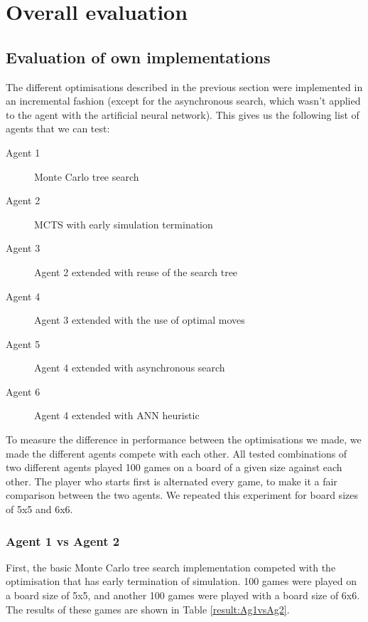 \section{Overall evaluation\label{s:evaluation}}

\subsection{Evaluation of own implementations\label{s:evaluationOwn}}
The different optimisations described in the previous section were implemented in an incremental fashion (except for the asynchronous search, which wasn't applied to the agent with the artificial neural network). This gives us the following list of agents that we can test:
\begin{description}
	\item[Agent 1] Monte Carlo tree search
	\item[Agent 2] MCTS with early simulation termination
	\item[Agent 3] Agent 2 extended with reuse of the search tree
	\item[Agent 4] Agent 3 extended with the use of optimal moves
	\item[Agent 5] Agent 4 extended with asynchronous search
	\item[Agent 6] Agent 4 extended with ANN heuristic
\end{description}

To measure the difference in performance between the optimisations we made, we made the different agents compete with each other. All tested combinations of two different agents played 100 games on a board of a given size against each other. The player who starts first is alternated every game, to make it a fair comparison between the two agents.
We repeated this experiment for board sizes of 5x5 and 6x6.

\subsubsection{Agent 1 vs Agent 2}
First, the basic Monte Carlo tree search implementation competed with the optimisation that has early termination of simulation. 100 games were played on a board size of 5x5, and another 100 games were played with a board size of 6x6. The results of these games are shown in Table \ref{result:Ag1vsAg2}.


